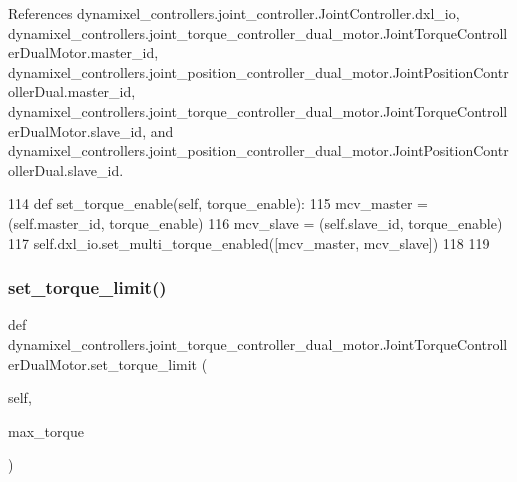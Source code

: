 References dynamixel\+\_\+controllers.\+joint\+\_\+controller.\+Joint\+Controller.\+dxl\+\_\+io, dynamixel\+\_\+controllers.\+joint\+\_\+torque\+\_\+controller\+\_\+dual\+\_\+motor.\+Joint\+Torque\+Controller\+Dual\+Motor.\+master\+\_\+id, dynamixel\+\_\+controllers.\+joint\+\_\+position\+\_\+controller\+\_\+dual\+\_\+motor.\+Joint\+Position\+Controller\+Dual.\+master\+\_\+id, dynamixel\+\_\+controllers.\+joint\+\_\+torque\+\_\+controller\+\_\+dual\+\_\+motor.\+Joint\+Torque\+Controller\+Dual\+Motor.\+slave\+\_\+id, and dynamixel\+\_\+controllers.\+joint\+\_\+position\+\_\+controller\+\_\+dual\+\_\+motor.\+Joint\+Position\+Controller\+Dual.\+slave\+\_\+id.


\begin{DoxyCode}
114     \textcolor{keyword}{def }set\_torque\_enable(self, torque\_enable):
115         mcv\_master = (self.master\_id, torque\_enable)
116         mcv\_slave = (self.slave\_id, torque\_enable)
117         self.dxl\_io.set\_multi\_torque\_enabled([mcv\_master, mcv\_slave])
118 
119 
\end{DoxyCode}
\mbox{\label{classdynamixel__controllers_1_1joint__torque__controller__dual__motor_1_1_joint_torque_controller_dual_motor_a642f142d5f8b18c8e556c0c0578eb95e}} 
\subsubsection{\texorpdfstring{set\+\_\+torque\+\_\+limit()}{set\_torque\_limit()}}
{\footnotesize\ttfamily def dynamixel\+\_\+controllers.\+joint\+\_\+torque\+\_\+controller\+\_\+dual\+\_\+motor.\+Joint\+Torque\+Controller\+Dual\+Motor.\+set\+\_\+torque\+\_\+limit (\begin{DoxyParamCaption}\item[{}]{self,  }\item[{}]{max\+\_\+torque }\end{DoxyParamCaption})}



